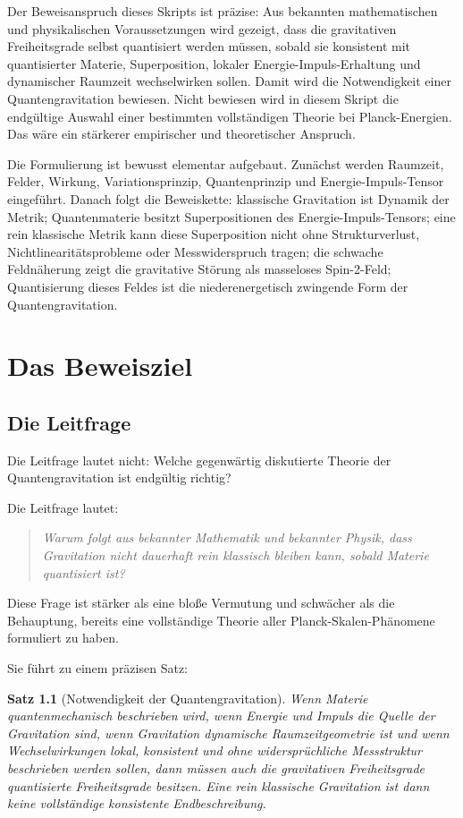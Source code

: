\documentclass[11pt,a4paper,oneside]{book}
\theoremstyle{definition}
\theoremstyle{plain}
\newtheorem{satz}[definition]{Satz}
\theoremstyle{remark}
\newenvironment{merkbox}{\begin{quote}\itshape}{\end{quote}}
\begin{document}
Der Beweisanspruch dieses Skripts ist präzise: Aus bekannten mathematischen und physikalischen Voraussetzungen wird gezeigt, dass die gravitativen Freiheitsgrade selbst quantisiert werden müssen, sobald sie konsistent mit quantisierter Materie, Superposition, lokaler Energie-Impuls-Erhaltung und dynamischer Raumzeit wechselwirken sollen. Damit wird die Notwendigkeit einer Quantengravitation bewiesen. Nicht bewiesen wird in diesem Skript die endgültige Auswahl einer bestimmten vollständigen Theorie bei Planck-Energien. Das wäre ein stärkerer empirischer und theoretischer Anspruch.

Die Formulierung ist bewusst elementar aufgebaut. Zunächst werden Raumzeit, Felder, Wirkung, Variationsprinzip, Quantenprinzip und Energie-Impuls-Tensor eingeführt. Danach folgt die Beweiskette: klassische Gravitation ist Dynamik der Metrik; Quantenmaterie besitzt Superpositionen des Energie-Impuls-Tensors; eine rein klassische Metrik kann diese Superposition nicht ohne Strukturverlust, Nichtlinearitätsprobleme oder Messwiderspruch tragen; die schwache Feldnäherung zeigt die gravitative Störung als masseloses Spin-2-Feld; Quantisierung dieses Feldes ist die niederenergetisch zwingende Form der Quantengravitation.

\tableofcontents
\mainmatter

\chapter{Das Beweisziel}
\section{Die Leitfrage}
Die Leitfrage lautet nicht: Welche gegenwärtig diskutierte Theorie der Quantengravitation ist endgültig richtig?

Die Leitfrage lautet:

\begin{merkbox}
Warum folgt aus bekannter Mathematik und bekannter Physik, dass Gravitation nicht dauerhaft rein klassisch bleiben kann, sobald Materie quantisiert ist?
\end{merkbox}

Diese Frage ist stärker als eine bloße Vermutung und schwächer als die Behauptung, bereits eine vollständige Theorie aller Planck-Skalen-Phänomene formuliert zu haben.

Sie führt zu einem präzisen Satz:

\begin{satz}[Notwendigkeit der Quantengravitation]
Wenn Materie quantenmechanisch beschrieben wird, wenn Energie und Impuls die Quelle der Gravitation sind, wenn Gravitation dynamische Raumzeitgeometrie ist und wenn Wechselwirkungen lokal, konsistent und ohne widersprüchliche Messstruktur beschrieben werden sollen, dann müssen auch die gravitativen Freiheitsgrade quantisierte Freiheitsgrade besitzen. Eine rein klassische Gravitation ist dann keine vollständige konsistente Endbeschreibung.
\end{satz}
\end{document}
